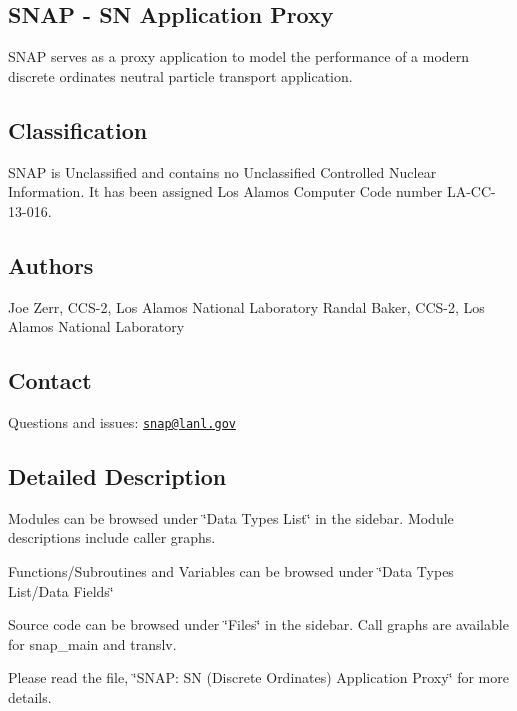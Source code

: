 \subsection*{S\-N\-A\-P -\/ S\-N Application Proxy}

S\-N\-A\-P serves as a proxy application to model the performance of a modern discrete ordinates neutral particle transport application.

\subsection*{Classification}

S\-N\-A\-P is Unclassified and contains no Unclassified Controlled Nuclear Information. It has been assigned Los Alamos Computer Code number L\-A-\/\-C\-C-\/13-\/016.

\subsection*{Authors}

Joe Zerr, C\-C\-S-\/2, Los Alamos National Laboratory Randal Baker, C\-C\-S-\/2, Los Alamos National Laboratory

\subsection*{Contact}

Questions and issues\-: \href{mailto:snap@lanl.gov}{\tt snap@lanl.\-gov}

\subsection*{Detailed Description}

Modules can be browsed under \char`\"{}\-Data Types List\char`\"{} in the sidebar. Module descriptions include caller graphs.

Functions/\-Subroutines and Variables can be browsed under \char`\"{}\-Data Types List/\-Data Fields\char`\"{}

Source code can be browsed under \char`\"{}\-Files\char`\"{} in the sidebar. Call graphs are available for snap\-\_\-main and translv.

Please read the file, \char`\"{}\-S\-N\-A\-P\-: S\-N (\-Discrete Ordinates) Application Proxy\char`\"{} for more details. 